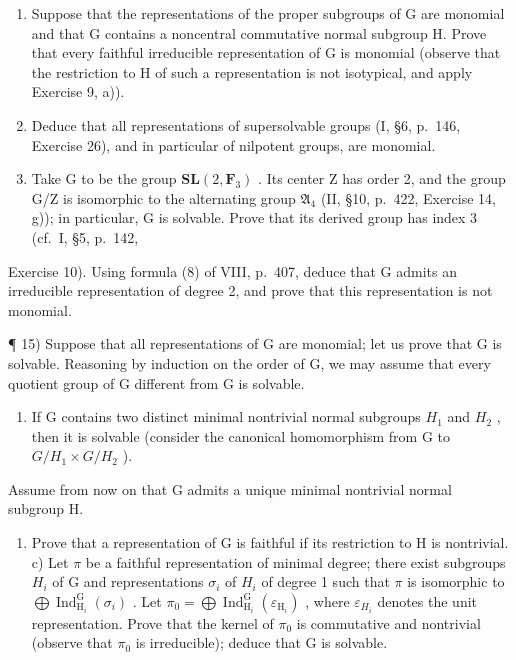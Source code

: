\begin{enumerate}
\def\labelenumi{\alph{enumi})}
\item
  Suppose that the representations of the proper subgroups of G are monomial and that G contains a noncentral commutative normal subgroup H. Prove that every faithful irreducible representation of G is monomial (observe that the restriction to H of such a representation is not isotypical, and apply Exercise 9, a)).
\item
  Deduce that all representations of supersolvable groups (I, §6, p.~146, Exercise 26), and in particular of nilpotent groups, are monomial.
\item
  Take G to be the group \(\mathbf{SL}(2,\mathbf{F}_{3})\) . Its center Z has order 2, and the group G/Z is isomorphic to the alternating group \(\mathfrak{A}_{4}\) (II, §10, p.~422, Exercise 14, g)); in particular, G is solvable. Prove that its derived group has index 3 (cf.~I, §5, p.~142,
\end{enumerate}

Exercise 10). Using formula (8) of VIII, p.~407, deduce that G admits an irreducible representation of degree 2, and prove that this representation is not monomial.

¶ 15) Suppose that all representations of G are monomial; let us prove that G is solvable. Reasoning by induction on the order of G, we may assume that every quotient group of G different from G is solvable.

\begin{enumerate}
\def\labelenumi{\alph{enumi})}
\tightlist
\item
  If G contains two distinct minimal nontrivial normal subgroups \(H_{1}\) and \(H_{2}\) , then it is solvable (consider the canonical homomorphism from G to \(G/H_{1} \times G/H_{2}\) ).
\end{enumerate}

Assume from now on that G admits a unique minimal nontrivial normal subgroup H.

\begin{enumerate}
\def\labelenumi{\alph{enumi})}
\setcounter{enumi}{1}
\tightlist
\item
  Prove that a representation of G is faithful if its restriction to H is nontrivial. c) Let \(\pi\) be a faithful representation of minimal degree; there exist subgroups \(H_{i}\) of G and representations \(\sigma_{i}\) of \(H_{i}\) of degree 1 such that \(\pi\) is isomorphic to \(\bigoplus\operatorname{Ind}_{\operatorname{H}_{i}}^{\operatorname{G}}(\sigma_{i})\) . Let \(\pi_{0}=\bigoplus\operatorname{Ind}_{\operatorname{H}_{i}}^{\operatorname{G}}(\varepsilon_{\operatorname{H}_{i}})\) , where \(\varepsilon_{H_{i}}\) denotes the unit representation. Prove that the kernel of \(\pi_{0}\) is commutative and nontrivial (observe that \(\pi_{0}\) is irreducible); deduce that G is solvable.
\end{enumerate}

